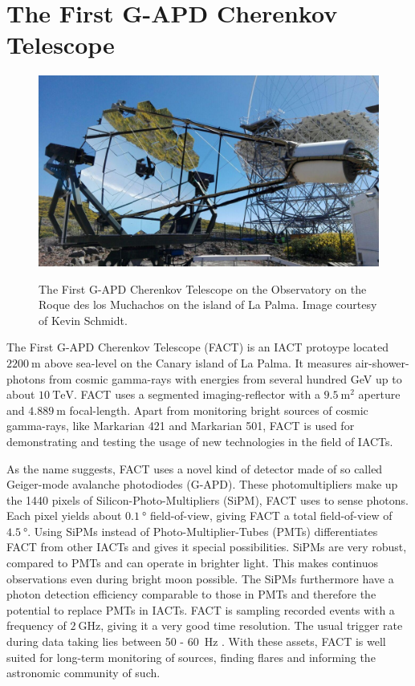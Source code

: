 \chapter{The First G-APD Cherenkov Telescope}\label{ch:fact}
%
\begin{figure}
  \centering
  \includegraphics[width=\textwidth]{Plots/fact.jpg}
  \label{fig:fact}
  \caption{The First G-APD Cherenkov Telescope on the Observatory on the Roque des los Muchachos on the island of La Palma. Image courtesy of Kevin Schmidt.}
\end{figure}
%
The First G-APD Cherenkov Telescope \cite{FACT-Design} (FACT) is an IACT
protoype located $\SI{2200}{\metre}$ above sea-level on the Canary island of La
Palma. It measures air-shower-photons from cosmic gamma-rays with energies from
several hundred GeV up to about $\SI{10}{\tera\electronvolt}$. FACT uses a
segmented imaging-reflector with a $\SI{9.5}{\meter\squared}$ aperture and
$\SI{4.889}{\meter}$ focal-length. Apart from monitoring bright sources of
cosmic gamma-rays, like Markarian 421 and Markarian 501, FACT is used for
demonstrating and testing the usage of new technologies in the field of IACTs.

As the name suggests, FACT uses a novel kind of detector made of so called
Geiger-mode avalanche photodiodes (G-APD). These photomultipliers make up
the 1440 pixels of Silicon-Photo-Multipliers (SiPM), FACT uses to sense
photons. Each pixel yields about $\SI{0.1}{\degree}$ field-of-view, giving FACT
a total field-of-view of $\SI{4.5}{\degree}$. Using SiPMs instead of
Photo-Multiplier-Tubes (PMTs) differentiates FACT from other IACTs and gives it
special possibilities. SiPMs are very robust, compared to PMTs and can operate
in brighter light. This makes continuos observations even during bright moon
possible. The SiPMs furthermore have a photon detection efficiency comparable to those in PMTs and therefore the potential to replace PMTs in IACTs. FACT is sampling recorded
events with a frequency of $\SI{2}{\giga\hertz}$, giving it a very good time
resolution. The usual trigger rate during data taking lies between \num{50} - \SI{60}{\hertz} \cite{FACT-Design}. With these assets, FACT is well suited for long-term monitoring of
sources, finding flares and informing the astronomic community of such.
